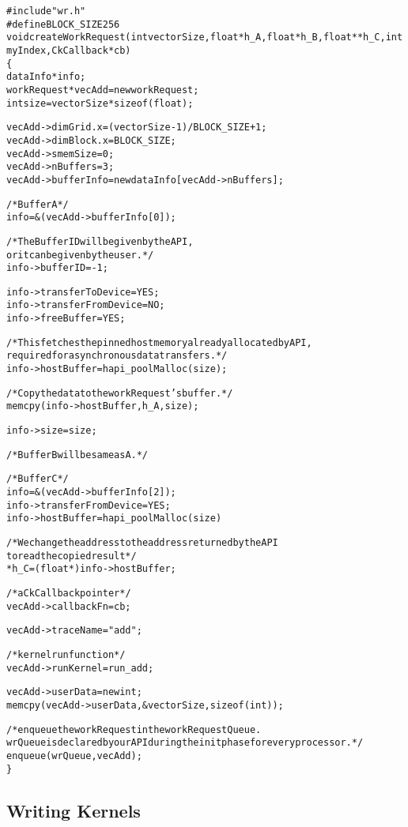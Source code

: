 \begin{alltt}
#include "wr.h"
#define BLOCK_SIZE 256
void createWorkRequest(int vectorSize, float *h_A, float *h_B, float **h_C, int myIndex, CkCallback *cb)
\{
    dataInfo *info;
    workRequest *vecAdd = new workRequest;
    int size = vectorSize * sizeof(float);

    vecAdd->dimGrid.x = (vectorSize - 1) / BLOCK_SIZE + 1;
    vecAdd->dimBlock.x = BLOCK_SIZE;
    vecAdd->smemSize = 0;
    vecAdd->nBuffers = 3;
    vecAdd->bufferInfo = new dataInfo[vecAdd->nBuffers];

    /* Buffer A */
    info = &(vecAdd->bufferInfo[0]);

    /* The Buffer ID will be given by the API,
       or it can be given by the user. */
    info->bufferID = -1;

    info->transferToDevice = YES;
    info->transferFromDevice = NO;
    info->freeBuffer = YES;

    /* This fetches the pinned host memory already allocated by API,
       required for asynchronous data transfers. */
    info->hostBuffer = hapi_poolMalloc(size);

    /* Copy the data to the workRequest's buffer. */
    memcpy(info->hostBuffer, h_A, size);

    info->size = size;

    /* Buffer B will be same as A.*/

    /* Buffer C */
    info = &(vecAdd->bufferInfo[2]);
    info->transferFromDevice = YES;
    info->hostBuffer = hapi_poolMalloc(size)

    / * We change the address to the address returned by the API
        to read the copied result */
    *h_C = (float *)info->hostBuffer;

    /* a CkCallback pointer */
    vecAdd->callbackFn = cb;

    vecAdd->traceName = "add";

    /* kernel run function */
    vecAdd->runKernel = run_add;

    vecAdd->userData = new int;
    memcpy(vecAdd->userData, &vectorSize, sizeof(int));

    /* enqueue the workRequest in the workRequestQueue.
    wrQueue is declared by our API during the init phase for every processor. */
    enqueue(wrQueue, vecAdd);
\}
\end{alltt}

\subsection{Writing Kernels}

